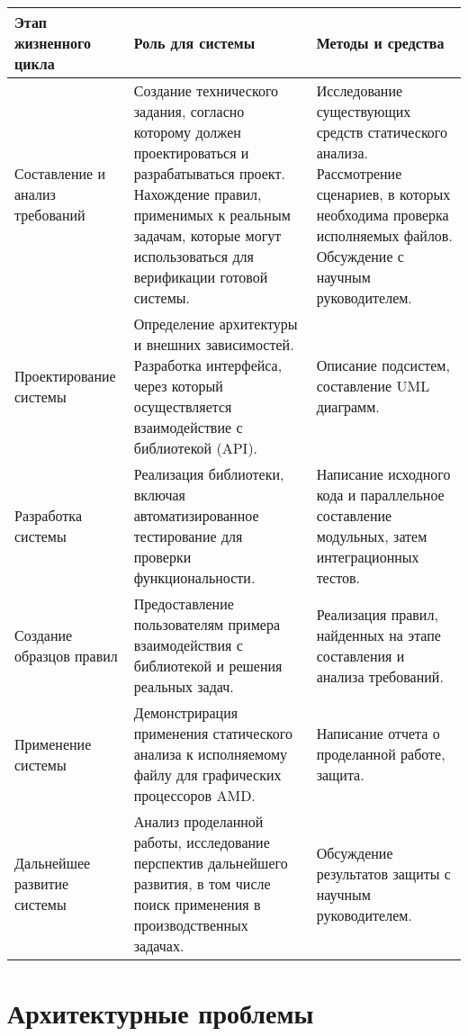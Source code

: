 \documentclass[listings]{labreport}
\begin{document}
\renewcommand{\arraystretch}{1.5}
\noindent
\begin{tabular}{|L{3.2cm}|L{7.6cm}|L{5.6cm}|} 
\hline
\textbf{Этап жизненного цикла} & \textbf{Роль для системы} & \textbf{Методы и средства} \\\hline
Составление и анализ требований
  & Создание технического задания, согласно которому должен проектироваться и разрабатываться проект.
    Нахождение правил, применимых к реальным задачам, которые могут использоваться для верификации готовой системы.
  & Исследование существующих средств статического анализа. Рассмотрение сценариев, в которых необходима проверка исполняемых файлов. Обсуждение с научным руководителем.
  \\\hline
Проектирование системы
  & Определение архитектуры и внешних зависимостей. Разработка интерфейса, через который осуществляется взаимодействие с библиотекой (API).
  & Описание подсистем, составление UML диаграмм.
  \\\hline
Разработка системы
  & Реализация библиотеки, включая автоматизированное тестирование для проверки функциональности.
  & Написание исходного кода и параллельное составление модульных, затем интеграционных тестов.
  \\\hline
Создание образцов правил
  & Предоставление пользователям примера взаимодействия с библиотекой и решения реальных задач.
  & Реализация правил, найденных на этапе составления и анализа требований.
  \\\hline
Применение системы
  & Демонстрирация применения статического анализа к исполняемому файлу для графических процессоров AMD.
  & Написание отчета о проделанной работе, защита.
  \\\hline
Дальнейшее развитие системы
  & Анализ проделанной работы, исследование перспектив дальнейшего развития, в том числе поиск применения в производственных задачах. 
  & Обсуждение результатов защиты с научным руководителем.
  \\\hline
\end{tabular}

\newpage
\section*{Архитектурные проблемы}
\end{document}
